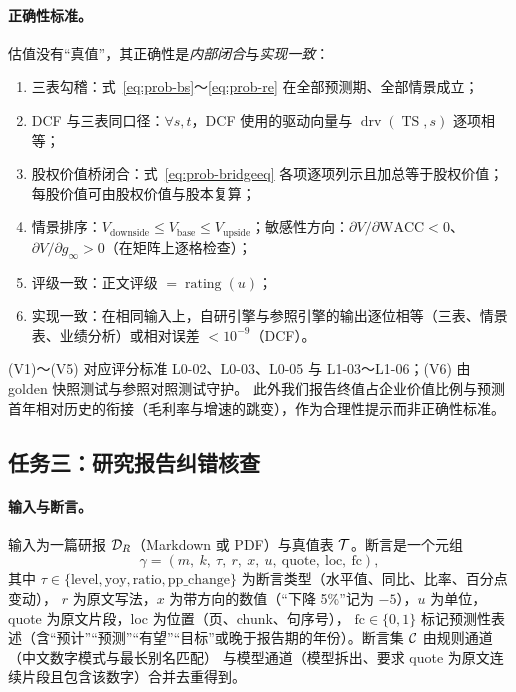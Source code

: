 \paragraph{正确性标准。}
估值没有“真值”，其正确性是\emph{内部闭合}与\emph{实现一致}：
\begin{enumerate}[label=(V\arabic*)]
\item 三表勾稽：式~\eqref{eq:prob-bs}～\eqref{eq:prob-re} 在全部预测期、全部情景成立；
\item DCF 与三表同口径：$\forall s,t$，DCF 使用的驱动向量与 $\operatorname{drv}(\operatorname{TS},s)$ 逐项相等；
\item 股权价值桥闭合：式~\eqref{eq:prob-bridgeeq} 各项逐项列示且加总等于股权价值；每股价值可由股权价值与股本复算；
\item 情景排序：$V_{\text{downside}}\le V_{\text{base}}\le V_{\text{upside}}$；敏感性方向：$\partial V/\partial\text{WACC}<0$、$\partial V/\partial g_\infty>0$（在矩阵上逐格检查）；
\item 评级一致：正文评级 $=\operatorname{rating}(u)$；
\item 实现一致：在相同输入上，自研引擎与参照引擎的输出逐位相等（三表、情景表、业绩分析）或相对误差 $<10^{-9}$（DCF）。
\end{enumerate}
(V1)～(V5) 对应评分标准 L0-02、L0-03、L0-05 与 L1-03～L1-06；(V6) 由 golden 快照测试与参照对照测试守护。
此外我们报告终值占企业价值比例与预测首年相对历史的衔接（毛利率与增速的跳变），作为合理性提示而非正确性标准。

\subsection{任务三：研究报告纠错核查}
\label{sec:prob-task5}

\paragraph{输入与断言。}
输入为一篇研报 $\mathcal{D}_R$（Markdown 或 PDF）与真值表 $\mathcal{T}$。断言是一个元组
\[
\gamma = (m,\ k,\ \tau,\ r,\ x,\ u,\ \text{quote},\ \text{loc},\ \text{fc}),
\]
其中 $\tau\in\{\text{level},\text{yoy},\text{ratio},\text{pp\_change}\}$ 为断言类型（水平值、同比、比率、百分点变动），
$r$ 为原文写法，$x$ 为带方向的数值（“下降 5\%”记为 $-5$），$u$ 为单位，quote 为原文片段，loc 为位置（页、chunk、句序号），
$\text{fc}\in\{0,1\}$ 标记预测性表述（含“预计”“预测”“有望”“目标”或晚于报告期的年份）。断言集 $\mathcal{C}$ 由规则通道（中文数字模式与最长别名匹配）
与模型通道（模型拆出、要求 quote 为原文连续片段且包含该数字）合并去重得到。

